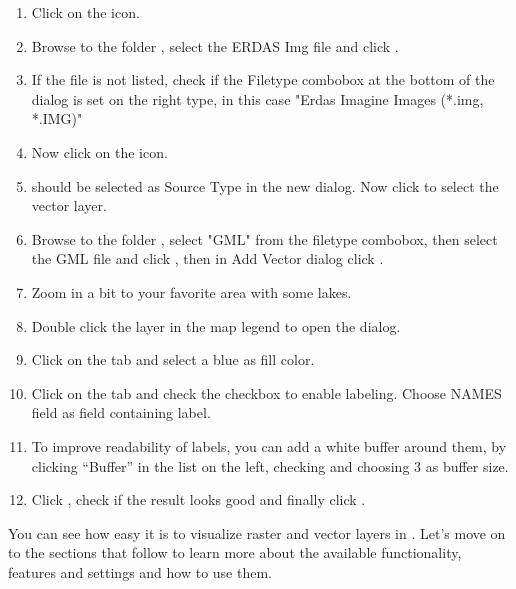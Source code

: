 {\setlength{\baselineskip}{1.3\baselineskip}
\begin{enumerate}[itemsep=2pt]
\item Click on the  icon.
\item Browse to the folder , select 
the ERDAS Img file  and click .
\item If the file is not listed, check if the Filetype combobox at the
bottom of the dialog is set on the right type, in this case "Erdas Imagine
Images (*.img, *.IMG)"
\item Now click on the  icon. 
\item {} should be selected as Source Type in the new
 dialog. Now click  to select the
vector layer.
\item Browse to the folder , select "GML"
from the filetype combobox, then select the GML file  
and click , then in Add Vector dialog click .
\item Zoom in a bit to your favorite area with some lakes.
\item Double click the  layer in the map legend to open the 
 dialog.
\item Click on the  tab and select a blue as fill color.
\item Click on the  tab and check the  
checkbox to enable labeling. Choose NAMES field as field containing label.
\item To improve readability of labels, you can add a white buffer around them,
by clicking ``Buffer'' in the list on the left, checking  and choosing 3 as buffer size.
\item Click , check if the result looks good and finally
click .
\end{enumerate} 
\par}
You can see how easy it is to visualize raster and vector layers in 
\qg. Let's move on to the sections that follow to learn more about the 
available functionality, features and settings and how to use them.

\FloatBarrier
